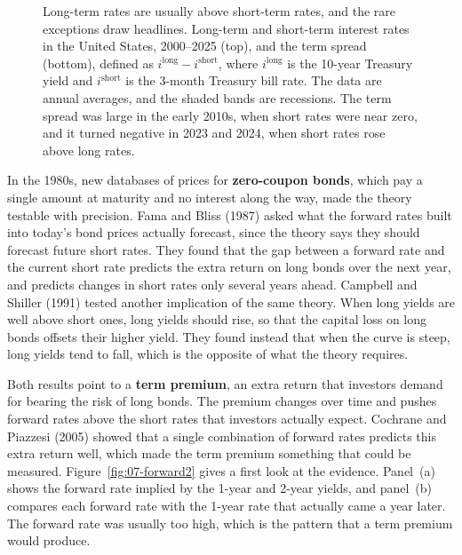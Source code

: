 \begin{figure}[htbp]
{%
}
\caption{Long-term rates are usually above short-term rates, and the rare exceptions draw headlines. Long-term and short-term interest rates in the United States, 2000--2025 (top), and the term spread (bottom), defined as $i^{\mathrm{long}} - i^{\mathrm{short}}$, where $i^{\mathrm{long}}$ is the 10-year Treasury yield and $i^{\mathrm{short}}$ is the 3-month Treasury bill rate. The data are annual averages, and the shaded bands are recessions. The term spread was large in the early 2010s, when short rates were near zero, and it turned negative in 2023 and 2024, when short rates rose above long rates.}
\label{fig:07-long-short}
\end{figure}

In the 1980s, new databases of prices for \textbf{zero-coupon bonds}, which pay a single amount at maturity and no interest along the way, made the theory testable with precision. Fama and Bliss (1987) asked what the forward rates built into today's bond prices actually forecast, since the theory says they should forecast future short rates. They found that the gap between a forward rate and the current short rate predicts the extra return on long bonds over the next year, and predicts changes in short rates only several years ahead. Campbell and Shiller (1991) tested another implication of the same theory. When long yields are well above short ones, long yields should rise, so that the capital loss on long bonds offsets their higher yield. They found instead that when the curve is steep, long yields tend to fall, which is the opposite of what the theory requires. 

Both results point to a \textbf{term premium}, an extra return that investors demand for bearing the risk of long bonds. The premium changes over time and pushes forward rates above the short rates that investors actually expect. Cochrane and Piazzesi (2005) showed that a single combination of forward rates predicts this extra return well, which made the term premium something that could be measured. Figure~\ref{fig:07-forward2} gives a first look at the evidence. Panel~(a) shows the forward rate implied by the 1-year and 2-year yields, and panel~(b) compares each forward rate with the 1-year rate that actually came a year later. The forward rate was usually too high, which is the pattern that a term premium would produce.

